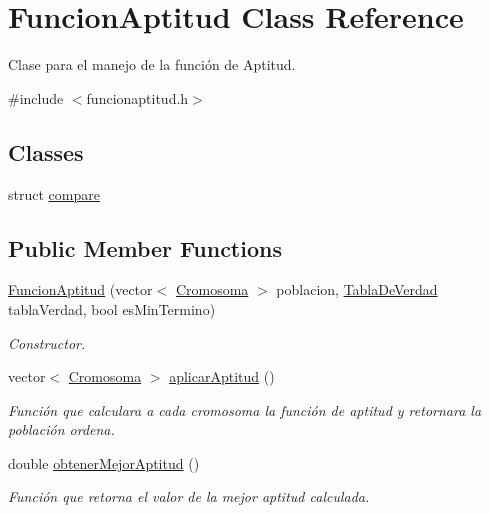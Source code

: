 \hypertarget{classFuncionAptitud}{\section{Funcion\-Aptitud Class Reference}
\label{classFuncionAptitud}
}


Clase para el manejo de la función de Aptitud.  




{\ttfamily \#include $<$funcionaptitud.\-h$>$}

\subsection*{Classes}
\begin{DoxyCompactItemize}
\item 
struct \hyperlink{structFuncionAptitud_1_1compare}{compare}
\end{DoxyCompactItemize}
\subsection*{Public Member Functions}
\begin{DoxyCompactItemize}
\item 
\hyperlink{classFuncionAptitud_a7e6eb419f2c5c754e96cc93ecebac0e3}{Funcion\-Aptitud} (vector$<$ \hyperlink{classCromosoma}{Cromosoma} $>$ poblacion, \hyperlink{classTablaDeVerdad}{Tabla\-De\-Verdad} tabla\-Verdad, bool es\-Min\-Termino)
\begin{DoxyCompactList}\small\item\em Constructor. \end{DoxyCompactList}\item 
vector$<$ \hyperlink{classCromosoma}{Cromosoma} $>$ \hyperlink{classFuncionAptitud_a45c1cdc83e08ba9b26a2f95fc49523f1}{aplicar\-Aptitud} ()
\begin{DoxyCompactList}\small\item\em Función que calculara a cada cromosoma la función de aptitud y retornara la población ordena. \end{DoxyCompactList}\item 
double \hyperlink{classFuncionAptitud_a4719bc3182eeba62dd27a595f659ee8c}{obtener\-Mejor\-Aptitud} ()
\begin{DoxyCompactList}\small\item\em Función que retorna el valor de la mejor aptitud calculada. \end{DoxyCompactList}\end{DoxyCompactItemize}


